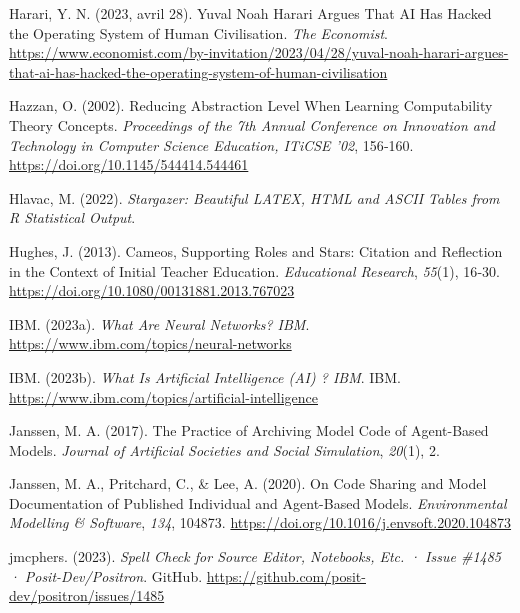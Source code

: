 \documentclass[
  letterpaper,
  DIV=11,
  numbers=noendperiod,
  oneside]{scrreprt}
\newlength{\cslhangindent}
\newlength{\cslentryspacingunit} %
\newenvironment{CSLReferences}[2] %
 {%
  \setlength{\parindent}{0pt}
  \ifodd #1
  \let\oldpar\par
  \def\par{\hangindent=\cslhangindent\oldpar}
  \fi
  \setlength{\parskip}{#2\cslentryspacingunit}
 }%
 {}
\begin{document}
\begin{CSLReferences}{1}{0}
\leavevmode{}%
Harari, Y. N. (2023, avril 28). Yuval {Noah Harari} Argues That {AI} Has
Hacked the Operating System of Human Civilisation. \emph{The Economist}.
\url{https://www.economist.com/by-invitation/2023/04/28/yuval-noah-harari-argues-that-ai-has-hacked-the-operating-system-of-human-civilisation}

\leavevmode{}%
Hazzan, O. (2002). Reducing Abstraction Level When Learning
Computability Theory Concepts. \emph{Proceedings of the 7th Annual
Conference on {Innovation} and Technology in Computer Science Education,
{ITiCSE} '02}, 156‑160. \url{https://doi.org/10.1145/544414.544461}

\leavevmode{}%
Hlavac, M. (2022). \emph{Stargazer: Beautiful {LATEX}, {HTML} and
{ASCII} Tables from {R} Statistical Output}.

\leavevmode{}%
Hughes, J. (2013). Cameos, Supporting Roles and Stars: Citation and
Reflection in the Context of Initial Teacher Education.
\emph{Educational Research}, \emph{55}(1), 16‑30.
\url{https://doi.org/10.1080/00131881.2013.767023}

\leavevmode{}%
IBM. (2023a). \emph{What Are {Neural Networks}? \textbar{} {IBM}}.
\url{https://www.ibm.com/topics/neural-networks}

\leavevmode{}%
IBM. (2023b). \emph{What Is {Artificial Intelligence} ({AI}) ?
\textbar{} {IBM}}. IBM.
\url{https://www.ibm.com/topics/artificial-intelligence}

\leavevmode{}%
Janssen, M. A. (2017). The {Practice} of {Archiving Model Code} of
{Agent-Based Models}. \emph{Journal of Artificial Societies and Social
Simulation}, \emph{20}(1), 2.

\leavevmode{}%
Janssen, M. A., Pritchard, C., \& Lee, A. (2020). On Code Sharing and
Model Documentation of Published Individual and Agent-Based Models.
\emph{Environmental Modelling \& Software}, \emph{134}, 104873.
\url{https://doi.org/10.1016/j.envsoft.2020.104873}

\leavevmode{}%
jmcphers. (2023). \emph{Spell Check for Source Editor, Notebooks, Etc. ·
{Issue} \#1485 · Posit-Dev/Positron}. GitHub.
\url{https://github.com/posit-dev/positron/issues/1485}


\end{CSLReferences}
\end{document}
